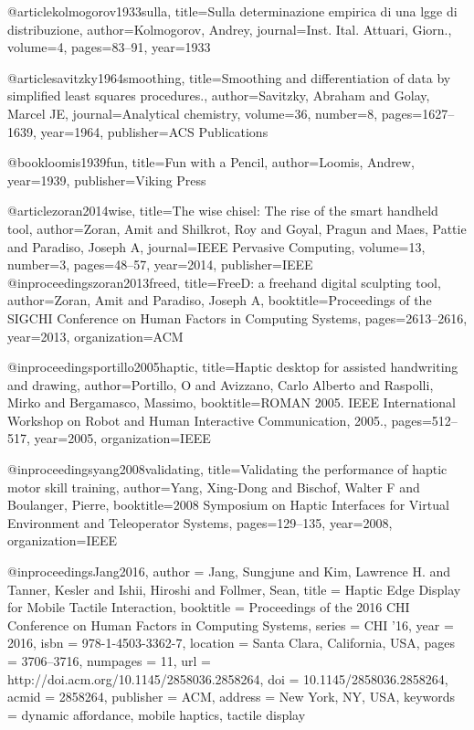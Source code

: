 @article{kolmogorov1933sulla,
  title={Sulla determinazione empirica di una lgge di distribuzione},
  author={Kolmogorov, Andrey},
  journal={Inst. Ital. Attuari, Giorn.},
  volume={4},
  pages={83--91},
  year={1933}
}

@article{savitzky1964smoothing,
  title={Smoothing and differentiation of data by simplified least squares procedures.},
  author={Savitzky, Abraham and Golay, Marcel JE},
  journal={Analytical chemistry},
  volume={36},
  number={8},
  pages={1627--1639},
  year={1964},
  publisher={ACS Publications}
}


@book{loomis1939fun,
  title={Fun with a Pencil},
  author={Loomis, Andrew},
  year={1939},
  publisher={Viking Press}
}

@article{zoran2014wise,
  title={The wise chisel: The rise of the smart handheld tool},
  author={Zoran, Amit and Shilkrot, Roy and Goyal, Pragun and Maes, Pattie and Paradiso, Joseph A},
  journal={IEEE Pervasive Computing},
  volume={13},
  number={3},
  pages={48--57},
  year={2014},
  publisher={IEEE}
}
@inproceedings{zoran2013freed,
  title={FreeD: a freehand digital sculpting tool},
  author={Zoran, Amit and Paradiso, Joseph A},
  booktitle={Proceedings of the SIGCHI Conference on Human Factors in Computing Systems},
  pages={2613--2616},
  year={2013},
  organization={ACM}
}

@inproceedings{portillo2005haptic,
  title={Haptic desktop for assisted handwriting and drawing},
  author={Portillo, O and Avizzano, Carlo Alberto and Raspolli, Mirko and Bergamasco, Massimo},
  booktitle={ROMAN 2005. IEEE International Workshop on Robot and Human Interactive Communication, 2005.},
  pages={512--517},
  year={2005},
  organization={IEEE}
}

@inproceedings{yang2008validating,
  title={Validating the performance of haptic motor skill training},
  author={Yang, Xing-Dong and Bischof, Walter F and Boulanger, Pierre},
  booktitle={2008 Symposium on Haptic Interfaces for Virtual Environment and Teleoperator Systems},
  pages={129--135},
  year={2008},
  organization={IEEE}
}


@inproceedings{Jang2016,
 author = {Jang, Sungjune and Kim, Lawrence H. and Tanner, Kesler and Ishii, Hiroshi and Follmer, Sean},
 title = {{Haptic Edge Display for Mobile Tactile Interaction}},
 booktitle = {Proceedings of the 2016 CHI Conference on Human Factors in Computing Systems},
 series = {CHI '16},
 year = {2016},
 isbn = {978-1-4503-3362-7},
 location = {Santa Clara, California, USA},
 pages = {3706--3716},
 numpages = {11},
 url = {http://doi.acm.org/10.1145/2858036.2858264},
 doi = {10.1145/2858036.2858264},
 acmid = {2858264},
 publisher = {ACM},
 address = {New York, NY, USA},
 keywords = {dynamic affordance, mobile haptics, tactile display}
}

